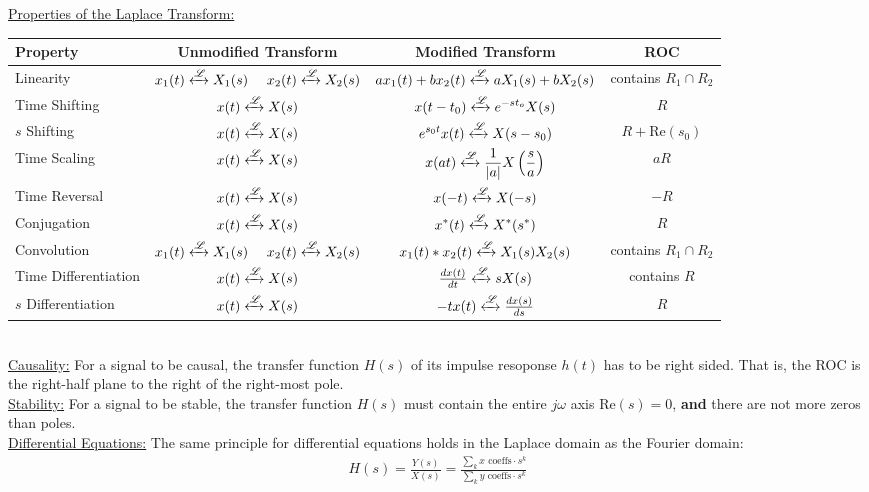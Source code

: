 \documentclass{article}
\newcommand{\sheader}[1]{\underline{#1:}}
\newcommand{\gap}{\medskip\\}
\newcommand{\jomega}{{j\omega}}
\newcommand{\Laplace}{\mathscr{L}}
\newcommand{\Laplacearrow}{\xleftrightarrow{\Laplace}}
\begin{document}
\sheader{Properties of the Laplace Transform}\\
\begin{tabular}{| l | c | c | c|}
\hline
Property & Unmodified Transform & Modified Transform & ROC \\
\hline 
Linearity & $\displaystyle x_1(t) \Laplacearrow X_1(s)$ \,\,\, $\displaystyle x_2(t) \Laplacearrow X_2(s)$ & $\displaystyle ax_1(t) + bx_2(t) \xleftrightarrow{\Laplace} aX_1(s) + bX_2(s)$ & contains $R_1 \cap R_2$\\
\hline
Time Shifting & $x(t) \Laplacearrow X(s) $ & $\displaystyle x(t - t_0) \Laplacearrow e^{-st_o}X(s)$ & $R$\\
\hline
$s$ Shifting & $\displaystyle x(t) \Laplacearrow X(s)$ & $\displaystyle e^{s_0 t}x(t) \Laplacearrow X(s- s_0)$ & $R + \textrm{Re}(s_0)$\\
\hline
Time Scaling & $\displaystyle x(t) \Laplacearrow X(s)$ & $\displaystyle x(at) \Laplacearrow \frac{1}{|a|}X\left(\frac{s}{a}\right)$ & $aR$\\
\hline 
Time Reversal & $\displaystyle x(t) \Laplacearrow X(s)$ & $\displaystyle x(-t) \Laplacearrow X(-s)$ & $-R$\\
\hline
Conjugation & $\displaystyle x(t) \Laplacearrow X(s)$ & $\displaystyle x^*(t) \Laplacearrow X^*(s^*)$ & $R$\\
\hline 
Convolution & $\displaystyle x_1(t) \Laplacearrow X_1(s)$ \,\,\, $\displaystyle x_2(t) \Laplacearrow X_2(s)$ & $\displaystyle x_1(t) \ast x_2(t) \Laplacearrow X_1(s)X_2(s)$ & contains $R_1 \cap R_2$\\
\hline
Time Differentiation & $\displaystyle x(t) \Laplacearrow X(s)$ & $\frac{dx(t)}{dt} \Laplacearrow sX(s)$ & contains $R$\\
\hline 
$s$ Differentiation & $\displaystyle x(t) \Laplacearrow X(s)$ & $-tx(t) \Laplacearrow \frac{dx(s)}{ds}$ & $R$\\
\hline
\end{tabular}
\gap
\sheader{Causality} For a signal to be causal, the transfer function $H(s)$
of its impulse resoponse $h(t)$ has to be right sided. That is, the ROC is the right-half 
plane to the right of the right-most pole.
\gap
\sheader{Stability} For a signal to be stable, the transfer function $H(s)$ 
must contain the entire $\jomega$ axis $\textrm{Re}(s) = 0$, \textbf{and} there are 
not more zeros than poles.
\gap
\sheader{Differential Equations} The same principle for differential equations holds in 
the Laplace domain as the Fourier domain:
\begin{align*}
    H(s) = \frac{Y(s)}{X(s)} = \frac{\sum_k{x \textrm{ coeffs} \cdot s^k} }{\sum_k{y \textrm{ coeffs} \cdot s^k}}
\end{align*}
\end{document}
